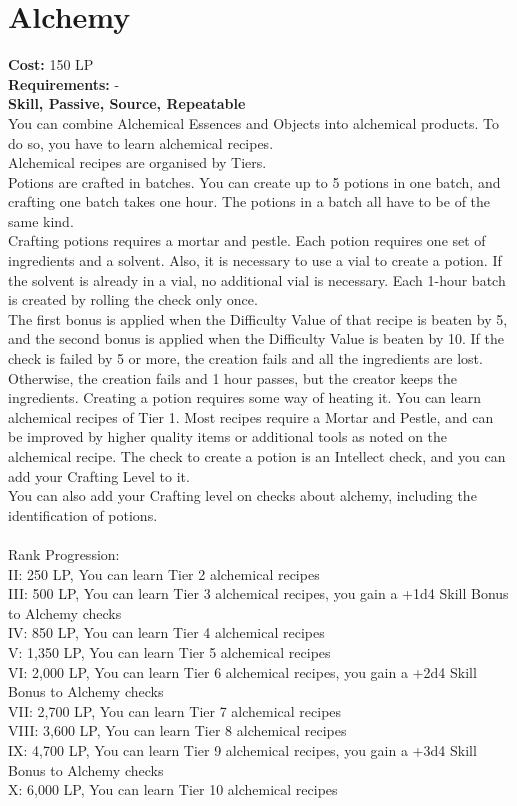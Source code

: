 \section{Alchemy}\label{perk:alchemy}
\textbf{Cost:} 150 LP\\
\textbf{Requirements:} -\\
\textbf{Skill, Passive, Source, Repeatable}\\
You can combine Alchemical Essences and Objects into alchemical products.
To do so, you have to learn alchemical recipes.\\
Alchemical recipes are organised by Tiers.\\
Potions are crafted in batches.
You can create up to 5 potions in one batch, and crafting one batch takes one hour.
The potions in a batch all have to be of the same kind.\\
Crafting potions requires a mortar and pestle.
Each potion requires one set of ingredients and a solvent.
Also, it is necessary to use a vial to create a potion.
If the solvent is already in a vial, no additional vial is necessary.
Each 1-hour batch is created by rolling the check only once.\\
The first bonus is applied when the Difficulty Value of that recipe is beaten by 5, and the second bonus is applied when the Difficulty Value is beaten by 10.
If the check is failed by 5 or more, the creation fails and all the ingredients are lost.
Otherwise, the creation fails and 1 hour passes, but the creator keeps the ingredients.
Creating a potion requires some way of heating it.
You can learn alchemical recipes of Tier 1.
Most recipes require a Mortar and Pestle, and can be improved by higher quality items or additional tools as noted on the alchemical recipe.
The check to create a potion is an Intellect check, and you can add your Crafting Level to it.\\
You can also add your Crafting level on checks about alchemy, including the identification of potions.\\
\\
Rank Progression:\\
II: 250 LP, You can learn Tier 2 alchemical recipes\\
III: 500 LP, You can learn Tier 3 alchemical recipes, you gain a +1d4 Skill Bonus to Alchemy checks\\
IV: 850 LP, You can learn Tier 4 alchemical recipes\\
V: 1,350 LP, You can learn Tier 5 alchemical recipes\\
VI: 2,000 LP, You can learn Tier 6 alchemical recipes, you gain a +2d4 Skill Bonus to Alchemy checks\\
VII: 2,700 LP, You can learn Tier 7 alchemical recipes\\
VIII: 3,600 LP, You can learn Tier 8 alchemical recipes\\
IX: 4,700 LP, You can learn Tier 9 alchemical recipes, you gain a +3d4 Skill Bonus to Alchemy checks\\
X: 6,000 LP, You can learn Tier 10 alchemical recipes\\